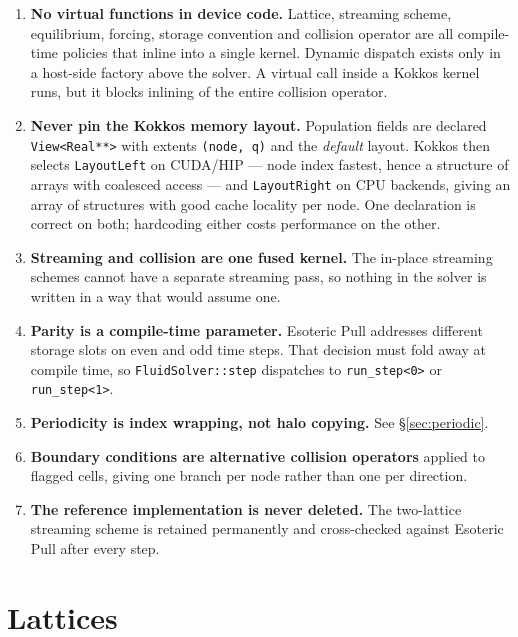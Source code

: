 \documentclass[11pt,a4paper]{article}
\newcommand{\code}[1]{\texttt{\small #1}}
\begin{document}
\begin{enumerate}[leftmargin=1.4em,itemsep=3pt]
\item \textbf{No virtual functions in device code.} Lattice, streaming scheme,
  equilibrium, forcing, storage convention and collision operator are all
  compile-time policies that inline into a single kernel. Dynamic dispatch exists
  only in a host-side factory above the solver. A virtual call inside a Kokkos
  kernel runs, but it blocks inlining of the entire collision operator.

\item \textbf{Never pin the Kokkos memory layout.} Population fields are declared
  \code{View<Real**>} with extents \code{(node, q)} and the \emph{default} layout.
  Kokkos then selects \code{LayoutLeft} on CUDA/HIP --- node index fastest, hence
  a structure of arrays with coalesced access --- and \code{LayoutRight} on
  CPU backends, giving an array of structures with good cache locality per node.
  One declaration is correct on both; hardcoding either costs performance on the
  other.

\item \textbf{Streaming and collision are one fused kernel.} The in-place
  streaming schemes cannot have a separate streaming pass, so nothing in the
  solver is written in a way that would assume one.

\item \textbf{Parity is a compile-time parameter.} Esoteric Pull addresses
  different storage slots on even and odd time steps. That decision must fold
  away at compile time, so \code{FluidSolver::step} dispatches to
  \code{run\_step<0>} or \code{run\_step<1>}.

\item \textbf{Periodicity is index wrapping, not halo copying.} See
  \S\ref{sec:periodic}.

\item \textbf{Boundary conditions are alternative collision operators} applied to
  flagged cells, giving one branch per node rather than one per direction.

\item \textbf{The reference implementation is never deleted.} The two-lattice
  streaming scheme is retained permanently and cross-checked against Esoteric
  Pull after every step.
\end{enumerate}

\section{Lattices}
\end{document}
